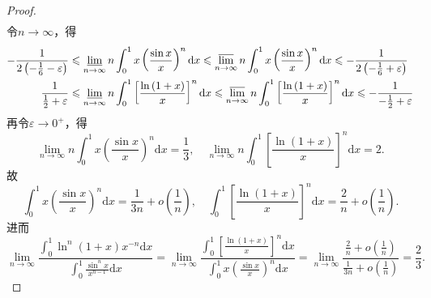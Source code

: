 \documentclass[../../main.tex]{subfiles}%
\begin{document}
\begin{proof}
\begin{gather*}
\end{gather*}
令$n\rightarrow \infty$，得
\begin{align*}
-\frac{1}{2\left( -\frac{1}{6}-\varepsilon \right)}&\leqslant \varliminf_{n\to \infty}n\int_0^1{x\left( \frac{\sin x}{x} \right) ^n\mathrm{d}x}\leqslant \varlimsup_{n\to \infty}n\int_0^1{x\left( \frac{\sin x}{x} \right) ^n\mathrm{d}x}\leqslant -\frac{1}{2\left( -\frac{1}{6}+\varepsilon \right)}\\
\frac{1}{\frac{1}{2}+\varepsilon}&\leqslant \varliminf_{n\to \infty}n\int_0^1{\left[ \frac{\ln \left( 1+x \right)}{x} \right] ^n\mathrm{d}x}\leqslant \varlimsup_{n\to \infty}n\int_0^1{\left[ \frac{\ln \left( 1+x \right)}{x} \right] ^n\mathrm{d}x}\leqslant -\frac{1}{-\frac{1}{2}+\varepsilon}
\end{align*}
再令$\varepsilon \rightarrow 0^+$，得
\[
\lim\limits_{n\rightarrow \infty}n\int_0^1{x\left( \frac{\sin x}{x} \right) ^n\mathrm{d}x}=\frac{1}{3},\quad \lim\limits_{n\rightarrow \infty}n\int_0^1{\left[ \frac{\ln \left( 1+x \right)}{x} \right] ^n\mathrm{d}x}=2.
\]
故
\[
\int_0^1{x\left( \frac{\sin x}{x} \right) ^n\mathrm{d}x}=\frac{1}{3n}+o\left( \frac{1}{n} \right) ,\quad \int_0^1{\left[ \frac{\ln \left( 1+x \right)}{x} \right] ^n\mathrm{d}x}=\frac{2}{n}+o\left( \frac{1}{n} \right) .
\]
进而
\[
\lim\limits_{n\rightarrow \infty}\frac{\int_0^1{\ln ^n(1 + x)x^{-n}\mathrm{d}x}}{\int_0^1{\frac{\sin ^nx}{x^{n-1}}\mathrm{d}x}}=\lim\limits_{n\rightarrow \infty}\frac{\int_0^1{\left[ \frac{\ln \left( 1+x \right)}{x} \right] ^n\mathrm{d}x}}{\int_0^1{x\left( \frac{\sin x}{x} \right) ^n\mathrm{d}x}}=\lim\limits_{n\rightarrow \infty}\frac{\frac{2}{n}+o\left( \frac{1}{n} \right)}{\frac{1}{3n}+o\left( \frac{1}{n} \right)}=\frac{2}{3}.
\]

\end{proof}
\end{document}
